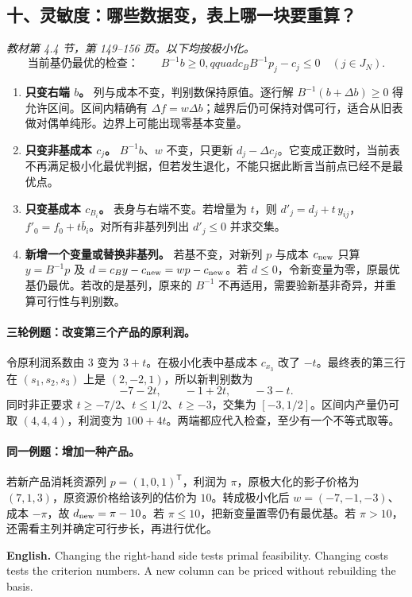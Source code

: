 \documentclass[UTF8,11pt,a4paper]{ctexart}
\newcommand{\EN}[1]{\par\noindent \textbf{English.} #1\par}
\begin{document}
\clearpage
\subsection*{十、灵敏度：哪些数据变，表上哪一块要重算？}
\noindent\textit{教材第 4.4 节，第 149--156 页。以下均按极小化。}
\[
\text{当前基仍最优的检查：}\qquad B^{-1}b\ge0,qquad c_BB^{-1}p_j-c_j\le0\quad (j\in J_N).
\]
\begin{enumerate}
\item \textbf{只变右端 $b$。} 列与成本不变，判别数保持原值。逐行解 $B^{-1}(b+\Delta b)\ge0$ 得允许区间。区间内精确有 $\Delta f=w\Delta b$；越界后仍可保持对偶可行，适合从旧表做对偶单纯形。边界上可能出现零基本变量。
\item \textbf{只变非基成本 $c_j$。} $B^{-1}b$、$w$ 不变，只更新 $d_j-\Delta c_j$。它变成正数时，当前表不再满足极小化最优判据，但若发生退化，不能只据此断言当前点已经不是最优点。
\item \textbf{只变基成本 $c_{B_i}$。} 表身与右端不变。若增量为 $t$，则 $d'_j=d_j+t\,y_{ij}$，$f'_0=f_0+t\bar b_i$。对所有非基列列出 $d'_j\le0$ 并求交集。
\item \textbf{新增一个变量或替换非基列。} 若基不变，对新列 $p$ 与成本 $c_{\rm new}$ 只算 $y=B^{-1}p$ 及 $d=c_By-c_{\rm new}=wp-c_{\rm new}$。若 $d\le0$，令新变量为零，原最优基仍最优。若改的是基列，原来的 $B^{-1}$ 不再适用，需要验新基非奇异，并重算可行性与判别数。
\end{enumerate}
\paragraph{三轮例题：改变第三个产品的原利润。}
令原利润系数由 $3$ 变为 $3+t$。在极小化表中基成本 $c_{x_3}$ 改了 $-t$。最终表的第三行在 $(s_1,s_2,s_3)$ 上是 $(2,-2,1)$，所以新判别数为
\[
 -7-2t,\qquad -1+2t,\qquad -3-t .
\]
同时非正要求 $t\ge-7/2$、$t\le 1/2$、$t\ge-3$，交集为 $[-3,1/2]$。区间内产量仍可取 $(4,4,4)$，利润变为 $100+4t$。两端都应代入检查，至少有一个不等式取等。

\paragraph{同一例题：增加一种产品。}
若新产品消耗资源列 $p=(1,0,1)^{\mathsf T}$，利润为 $\pi$，原极大化的影子价格为 $(7,1,3)$，原资源价格给该列的估价为 $10$。转成极小化后 $w=(-7,-1,-3)$、成本 $-\pi$，故 $d_{\rm new}=\pi-10$。若 $\pi\le10$，把新变量置零仍有最优基。若 $\pi>10$，还需看主列并确定可行步长，再进行优化。
\EN{Changing the right-hand side tests primal feasibility. Changing costs tests the criterion numbers. A new column can be priced without rebuilding the basis.}
\end{document}
